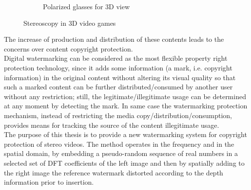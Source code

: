 \begin{figure}[h!]
\begin{subfigure}[]{0.4\textwidth}
                \caption{\scriptsize{Polarized glasses for 3D view}}
\end{subfigure} 
\caption{\small{Stereoscopy in 3D video games}}
\end{figure}

The increase of production and distribution of these contents leads to the concerns over content copyright protection.\\
Digital watermarking can be considered as the most flexible property right protection technology, since it adds some information (a mark, i.e. copyright information) in the
original content without altering its visual quality so that such a marked content can be further distributed/consumed by another user without any restriction; still, the legitimate/illegitimate usage can be determined at any moment by detecting the mark. In same case the watermarking protection mechanism, instead of restricting the media copy/distribution/consumption, provides means for tracking the source of the content illegitimate usage.\\
The purpose of this thesis is to provide a new watermarking system for copyright protection of stereo videos. The method operates in the frequency and in the spatial domain, by embedding a pseudo-random sequence of real numbers in a selected set of DFT coefficients of the left image and then by spatially adding to the right image the reference watermark distorted according to the depth information prior to insertion.\\

